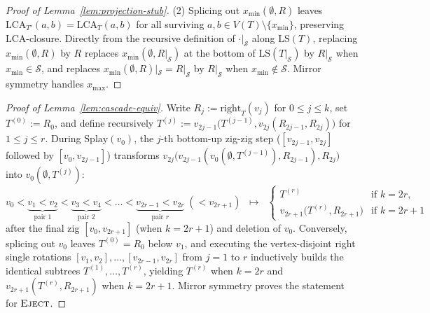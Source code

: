 \documentclass[11pt]{article}
\theoremstyle{definition}
\theoremstyle{remark}
\newcommand{\LS}{\mathrm{LS}}
\newcommand{\LCA}{\mathrm{LCA}}
\newcommand{\EJECT}{\textnormal{\scshape Eject}}
\begin{document}
\begin{proof}[Proof of Lemma~\ref{lem:projection-stub}]
(2) Splicing out $x_{\min}(\emptyset, R)$ leaves $\LCA_{T'}(a, b) = \LCA_T(a, b)$ for all surviving $a, b \in V(T) \setminus \{x_{\min}\}$, preserving $\LCA$-closure. Directly from the recursive definition of $\cdot|_{\mathcal{S}}$ along $\LS(T)$, replacing $x_{\min}(\emptyset, R)$ by $R$ replaces $x_{\min}(\emptyset, R|_{\mathcal{S}})$ at the bottom of $\LS(T|_{\mathcal{S}})$ by $R|_{\mathcal{S}}$ when $x_{\min} \in \mathcal{S}$, and replaces $x_{\min}(\emptyset, R)|_{\mathcal{S}} = R|_{\mathcal{S}}$ by $R|_{\mathcal{S}}$ when $x_{\min} \notin \mathcal{S}$. Mirror symmetry handles $x_{\max}$.
\end{proof}

\begin{proof}[Proof of Lemma~\ref{lem:cascade-equiv}]
Write $R_j := \mathrm{right}_T(v_j)$ for $0 \le j \le k$, set $T^{(0)} := R_0$, and define recursively $T^{(j)} := v_{2j-1}\big(T^{(j-1)},\allowbreak v_{2j}(R_{2j-1}, R_{2j})\big)$ for $1 \le j \le r$. During $\mathrm{Splay}(v_0)$, the $j$-th bottom-up zig-zig step ($[v_{2j-1}, v_{2j}]$ followed by $[v_0, v_{2j-1}]$) transforms $v_{2j}\big(v_{2j-1}(v_0(\emptyset, T^{(j-1)}),\allowbreak R_{2j-1}),\allowbreak R_{2j}\big)$ into $v_0(\emptyset, T^{(j)})$:
\[
v_0 < \underbrace{v_1 < v_2}_{\text{pair }1} < \underbrace{v_3 < v_4}_{\text{pair }2} < \dots < \underbrace{v_{2r-1} < v_{2r}}_{\text{pair }r} \; (< v_{2r+1})
\;\;\longmapsto\;\;
\begin{cases}
T^{(r)} & \text{if } k = 2r,\\
v_{2r+1}\big(T^{(r)}, R_{2r+1}\big) & \text{if } k = 2r + 1
\end{cases}
\]
after the final zig $[v_0, v_{2r+1}]$ (when $k = 2r + 1$) and deletion of $v_0$. Conversely, splicing out $v_0$ leaves $T^{(0)} = R_0$ below $v_1$, and executing the vertex-disjoint right single rotations $[v_1, v_2], \dots, [v_{2r-1}, v_{2r}]$ from $j = 1$ to $r$ inductively builds the identical subtrees $T^{(1)}, \dots, T^{(r)}$, yielding $T^{(r)}$ when $k = 2r$ and $v_{2r+1}(T^{(r)}, R_{2r+1})$ when $k = 2r + 1$. Mirror symmetry proves the statement for $\EJECT$.
\end{proof}
\end{document}
